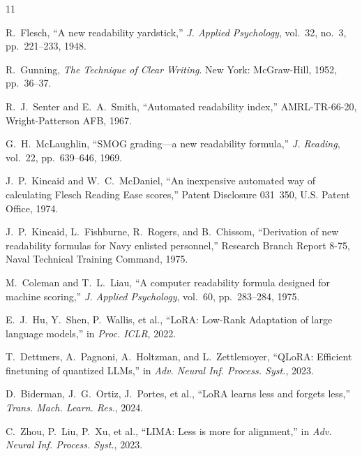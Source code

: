 \documentclass[conference]{IEEEtran}
\begin{document}
\begin{thebibliography}{11}

R.~Flesch, ``A new readability yardstick,'' \textit{J. Applied Psychology}, vol.~32, no.~3, pp.~221--233, 1948.

R.~Gunning, \textit{The Technique of Clear Writing}. New York: McGraw-Hill, 1952, pp.~36--37.

R.~J.~Senter and E.~A.~Smith, ``Automated readability index,'' AMRL-TR-66-20, Wright-Patterson AFB, 1967.

G.~H.~McLaughlin, ``SMOG grading---a new readability formula,'' \textit{J. Reading}, vol.~22, pp.~639--646, 1969.

J.~P.~Kincaid and W.~C.~McDaniel, ``An inexpensive automated way of calculating Flesch Reading Ease scores,'' Patent Disclosure 031~350, U.S. Patent Office, 1974.

J.~P.~Kincaid, L.~Fishburne, R.~Rogers, and B.~Chissom, ``Derivation of new readability formulas for Navy enlisted personnel,'' Research Branch Report 8-75, Naval Technical Training Command, 1975.

M.~Coleman and T.~L.~Liau, ``A computer readability formula designed for machine scoring,'' \textit{J. Applied Psychology}, vol.~60, pp.~283--284, 1975.

E.~J.~Hu, Y.~Shen, P.~Wallis, et al., ``LoRA: Low-Rank Adaptation of large language models,'' in \textit{Proc. ICLR}, 2022.

T.~Dettmers, A.~Pagnoni, A.~Holtzman, and L.~Zettlemoyer, ``QLoRA: Efficient finetuning of quantized LLMs,'' in \textit{Adv. Neural Inf. Process. Syst.}, 2023.

D.~Biderman, J.~G.~Ortiz, J.~Portes, et al., ``LoRA learns less and forgets less,'' \textit{Trans. Mach. Learn. Res.}, 2024.

C.~Zhou, P.~Liu, P.~Xu, et al., ``LIMA: Less is more for alignment,'' in \textit{Adv. Neural Inf. Process. Syst.}, 2023.

\end{thebibliography}
\end{document}
